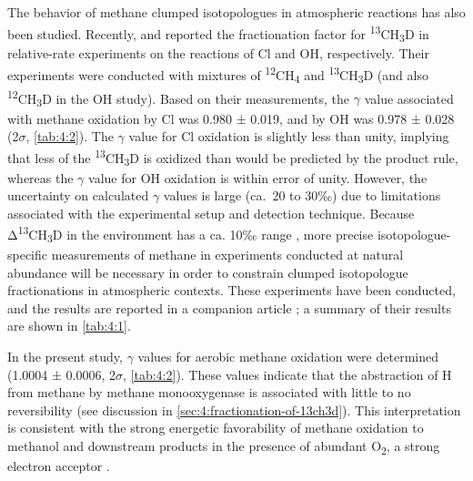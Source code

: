 The behavior of methane clumped isotopologues in atmospheric reactions
has also been studied. Recently, \textcite{Joelsson++_2014_CPL} and \textcite{Joelsson++_2016_ACP} reported the fractionation factor for
\textsuperscript{13}CH\textsubscript{3}D in relative-rate experiments on
the reactions of Cl and OH, respectively. Their experiments were
conducted with mixtures of \textsuperscript{12}CH\textsubscript{4} and
\textsuperscript{13}CH\textsubscript{3}D (and also
\textsuperscript{12}CH\textsubscript{3}D in the OH study). Based on
their measurements, the $\gamma$ value associated with methane oxidation by Cl
was 0.980 ± 0.019, and by OH was 0.978 ± 0.028 (2$\sigma$, \autoref{tab:4:2}). The $\gamma$
value for Cl oxidation is slightly less than unity, implying that less
of the \textsuperscript{13}CH\textsubscript{3}D is oxidized than would
be predicted by the product rule, whereas the $\gamma$ value for OH oxidation
is within error of unity. However, the uncertainty on calculated $\gamma$
values is large (ca.\ 20 to 30‰) due to limitations associated with the
experimental setup and detection technique. Because
Δ\textsuperscript{13}CH\textsubscript{3}D in the environment has a ca.
10‰ range \parencite{Wang++_2015_S}, more precise isotopologue-specific
measurements of methane in experiments conducted at natural abundance
will be necessary in order to constrain clumped isotopologue
fractionations in atmospheric contexts. These experiments have been
conducted, and the results are reported in a companion article
\parencite{Whitehill++_2017_GCA}; a summary of their results are shown in \autoref{tab:4:1}.%


In the present study, $\gamma$ values for aerobic methane oxidation were
determined (1.0004 ± 0.0006, 2$\sigma$, \autoref{tab:4:2}). These values indicate that
the abstraction of H from methane by methane monooxygenase is associated
with little to no reversibility (see discussion in \autoref{sec:4:fractionation-of-13ch3d}). This
interpretation is consistent with the strong energetic favorability of
methane oxidation to methanol and downstream products in the presence of
abundant O\textsubscript{2}, a strong electron acceptor \parencite{Cicerone+Oremland_1988_GBC,Hanson+Hanson_1996_MMBR}.

